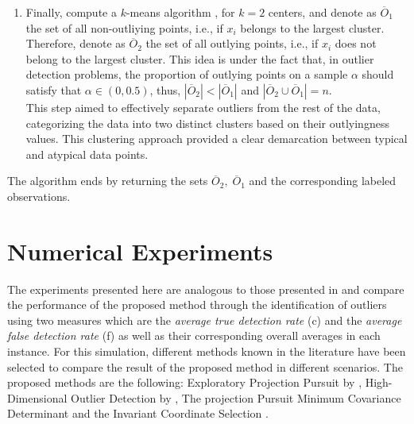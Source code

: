 \documentclass[12pt]{article}
\begin{document}
\begin{enumerate}
This scheme integrates univariate huberization \citep{VanAelst2010} with cellwise downweighting \citep{S.VanAelstandE.VandervierenandG.Willems2012}, ensuring that \( w_{li} \ge w_i \) and enhancing robustness under sparse cell contamination.


    \item Finally, compute a $k$-means algorithm \citep{mcqueen1967smc}, for $k=2$ centers, and denote as $\overline{O}_1$ the set of all non-outliying points, i.e., if $x_i$ belongs to the largest cluster. Therefore, denote as $\overline{O}_2$ the set of all outlying points, i.e., if $x_i$ does not belong to the largest cluster. This idea is under the fact that, in outlier detection problems, the proportion of outlying points on a sample $\alpha$ should satisfy that $\alpha\in(0,0.5)$, thus, $|\overline{O}_2|<|\overline{O}_1|$ and $|\overline{O}_2\cup\overline{O}_1|=n$.\\

    This step aimed to effectively separate outliers from the rest of the data, categorizing the data into two distinct clusters based on their outlyingness values. This clustering approach provided a clear demarcation between typical and atypical data points.
\end{enumerate}

The algorithm ends by returning the sets $\overline{O}_2,\;\overline{O}_1$ and the corresponding labeled observations.

\section{Numerical Experiments}\label{sec:simare}

The experiments presented here are analogous to those presented in \citep{PeñaPrieto2007} and compare the performance of the proposed method through the identification of outliers using two measures which are the \textit{average true detection rate} (c) and the \textit{average false detection rate} (f) as well as their corresponding overall averages in each instance. For this simulation, different methods known in the literature have been selected to compare the result of the proposed method in different scenarios. The proposed methods are the following: Exploratory Projection Pursuit by \citep{Fischer2021}, High-Dimensional Outlier Detection by \citep{Navarro2021}, The projection Pursuit Minimum Covariance Determinant \citep{PokojovyJobe2022} and the Invariant Coordinate Selection \citep{Archimbaud2018}. \\
\end{document}
